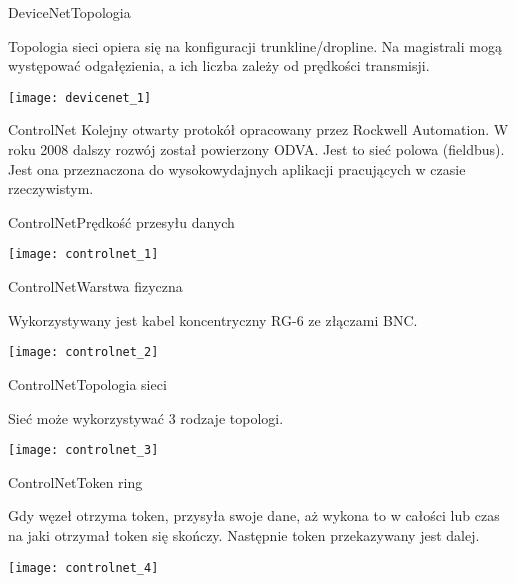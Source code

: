 \documentclass[11pt]{beamer}
\begin{document}
\begin{frame}{DeviceNet}{Topologia}

Topologia sieci opiera się na konfiguracji trunkline/dropline. Na magistrali mogą występować odgałęzienia, a ich liczba zależy od prędkości transmisji.

\medskip

\begin{center}
	\texttt{[image: devicenet\_1]}
\end{center}

\end{frame}


\begin{frame}{ControlNet}
Kolejny otwarty protokół opracowany przez Rockwell Automation. W roku 2008 dalszy rozwój został powierzony ODVA. Jest to sieć polowa (fieldbus). Jest ona przeznaczona do wysokowydajnych aplikacji pracujących w czasie rzeczywistym.
\end{frame}


\begin{frame}{ControlNet}{Prędkość przesyłu danych}

\begin{center}
	\texttt{[image: controlnet\_1]}
\end{center}
\end{frame}


\begin{frame}{ControlNet}{Warstwa fizyczna}

Wykorzystywany jest kabel koncentryczny RG-6 ze złączami BNC.

\begin{center}
	\texttt{[image: controlnet\_2]}
\end{center}
\end{frame}


\begin{frame}{ControlNet}{Topologia sieci}

Sieć może wykorzystywać 3 rodzaje topologi.

\begin{center}
	\texttt{[image: controlnet\_3]}
\end{center}
\end{frame}


\begin{frame}{ControlNet}{Token ring}

Gdy węzeł otrzyma token, przysyła swoje dane, aż wykona to w całości lub czas na jaki otrzymał token się skończy. Następnie token przekazywany jest dalej.

\begin{center}
	\texttt{[image: controlnet\_4]}
\end{center}
\end{frame}
\end{document}
